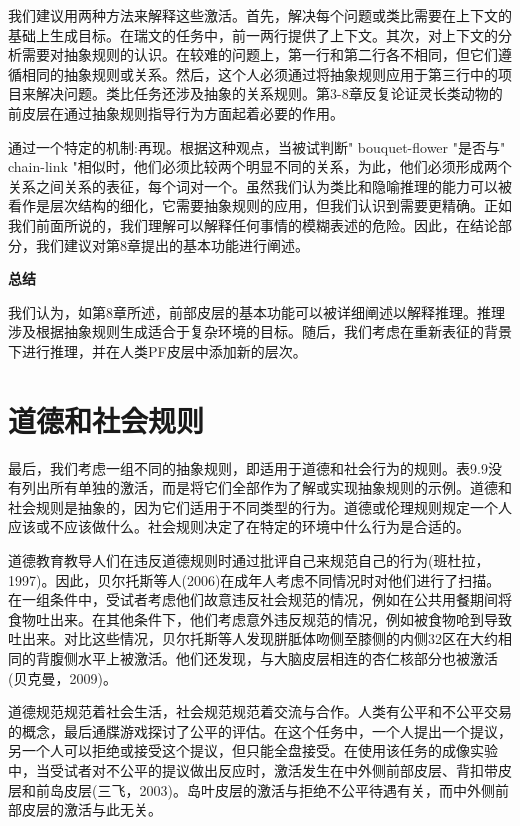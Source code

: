 我们建议用两种方法来解释这些激活。首先，解决每个问题或类比需要在上下文的基础上生成目标。在瑞文的任务中，前一两行提供了上下文。其次，对上下文的分析需要对抽象规则的认识。在较难的问题上，第一行和第二行各不相同，但它们遵循相同的抽象规则或关系。然后，这个人必须通过将抽象规则应用于第三行中的项目来解决问题。类比任务还涉及抽象的关系规则。第3-8章反复论证灵长类动物的前皮层在通过抽象规则指导行为方面起着必要的作用。

通过一个特定的机制:再现。根据这种观点，当被试判断" bouquet-flower "是否与" chain-link "相似时，他们必须比较两个明显不同的关系，为此，他们必须形成两个关系之间关系的表征，每个词对一个。虽然我们认为类比和隐喻推理的能力可以被看作是层次结构的细化，它需要抽象规则的应用，但我们认识到需要更精确。正如我们前面所说的，我们理解可以解释任何事情的模糊表述的危险。因此，在结论部分，我们建议对第8章提出的基本功能进行阐述。

\textbf{总结}

我们认为，如第8章所述，前部皮层的基本功能可以被详细阐述以解释推理。推理涉及根据抽象规则生成适合于复杂环境的目标。随后，我们考虑在重新表征的背景下进行推理，并在人类PF皮层中添加新的层次。

\section{道德和社会规则}

最后，我们考虑一组不同的抽象规则，即适用于道德和社会行为的规则。表9.9没有列出所有单独的激活，而是将它们全部作为了解或实现抽象规则的示例。道德和社会规则是抽象的，因为它们适用于不同类型的行为。道德或伦理规则规定一个人应该或不应该做什么。社会规则决定了在特定的环境中什么行为是合适的。

道德教育教导人们在违反道德规则时通过批评自己来规范自己的行为(班杜拉，1997)。因此，贝尔托斯等人(2006)在成年人考虑不同情况时对他们进行了扫描。在一组条件中，受试者考虑他们故意违反社会规范的情况，例如在公共用餐期间将食物吐出来。在其他条件下，他们考虑意外违反规范的情况，例如被食物呛到导致吐出来。对比这些情况，贝尔托斯等人发现胼胝体吻侧至膝侧的内侧32区在大约相同的背腹侧水平上被激活。他们还发现，与大脑皮层相连的杏仁核部分也被激活(贝克曼，2009)。

道德规范规范着社会生活，社会规范规范着交流与合作。人类有公平和不公平交易的概念，最后通牒游戏探讨了公平的评估。在这个任务中，一个人提出一个提议，另一个人可以拒绝或接受这个提议，但只能全盘接受。在使用该任务的成像实验中，当受试者对不公平的提议做出反应时，激活发生在中外侧前部皮层、背扣带皮层和前岛皮层(三飞，2003)。岛叶皮层的激活与拒绝不公平待遇有关，而中外侧前部皮层的激活与此无关。


